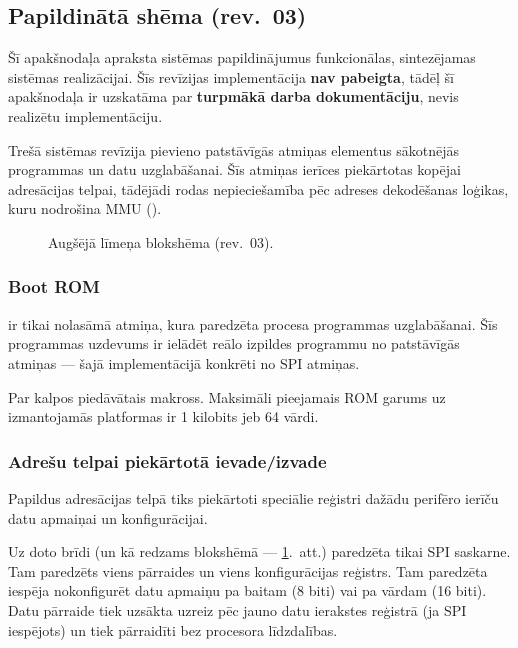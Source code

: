 \subsection{Papildinātā shēma (rev.~03)}
Šī apakšnodaļa apraksta sistēmas papildinājumus funkcionālas, sintezējamas
sistēmas realizācijai. Šīs revīzijas implementācija \textbf{nav pabeigta},
tādēļ šī apakšnodaļa ir uzskatāma par \textbf{turpmākā darba dokumentāciju},
nevis realizētu implementāciju.

Trešā sistēmas revīzija pievieno patstāvīgās atmiņas elementus sākotnējās
programmas un datu uzglabāšanai. Šīs atmiņas ierīces piekārtotas kopējai
adresācijas telpai, tādējādi rodas nepieciešamība pēc adreses dekodēšanas
loģikas, kuru nodrošina MMU ().

\begin{figure}[bhp]
	\centering
	\def\svgwidth{\textwidth}
	{}
	\caption{Augšējā līmeņa blokshēma (rev.~03).}
	\label{fig:top-rev3}
\end{figure}

\subsubsection{Boot ROM}
	 ir tikai nolasāmā atmiņa, kura paredzēta
	 procesa programmas uzglabāšanai.
	Šīs programmas uzdevums ir ielādēt reālo izpildes programmu no
	patstāvīgās atmiņas — šajā implementācijā konkrēti 
	no SPI  atmiņas.
	
	Par  kalpos  piedāvātais
	 makross.
	Maksimāli pieejamais ROM garums uz izmantojamās platformas ir
	1 kilobits jeb 64 vārdi.

\subsubsection{Adrešu telpai piekārtotā ievade/izvade}
	Papildus adresācijas telpā tiks piekārtoti speciālie reģistri dažādu
	perifēro ierīču datu apmaiņai un konfigurācijai.
	
	Uz doto brīdi (un kā redzams blokshēmā — \ref{fig:top-rev3}.~att.)
	paredzēta tikai SPI saskarne. Tam paredzēts viens pārraides un viens
	konfigurācijas reģistrs. Tam paredzēta iespēja nokonfigurēt datu
	apmaiņu pa baitam (8 biti) vai pa vārdam (16 biti). Datu pārraide tiek
	uzsākta uzreiz pēc jauno datu ierakstes reģistrā (ja SPI iespējots) un
	tiek pārraidīti bez procesora līdzdalības.
	
